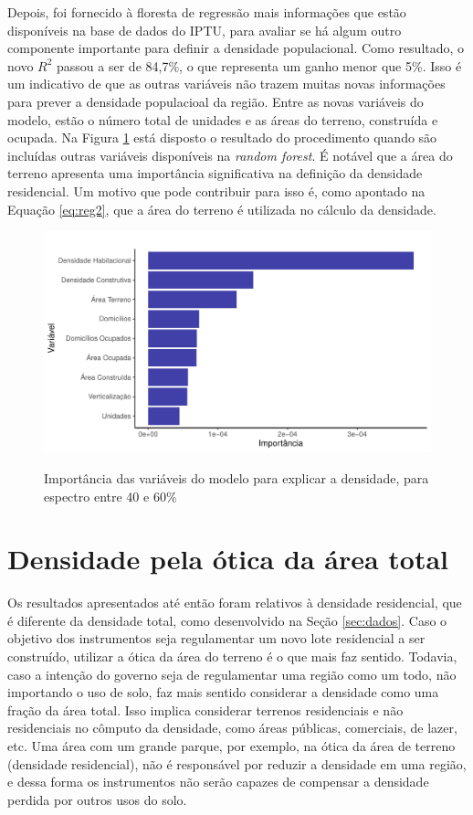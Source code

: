 Depois, foi fornecido à floresta de regressão mais informações que estão disponíveis na base de dados do IPTU, para avaliar se há algum outro componente importante para definir a densidade populacional. Como resultado, o novo $R^2$ passou a ser de 84,7\%, o que representa um ganho menor que 5\%. Isso é um indicativo de que as outras variáveis não trazem muitas novas informações para prever a densidade populacioal da região. Entre as novas variáveis do modelo, estão o número total de unidades e as áreas do terreno, construída e ocupada. Na Figura \ref{fig:importancia} está disposto o resultado do procedimento quando são incluídas outras variáveis disponíveis na \textit{random forest}. É notável que a área do terreno apresenta uma importância significativa na definição da densidade residencial. Um motivo que pode contribuir para isso é, como apontado na Equação \ref{eq:reg2}, que a área do terreno é utilizada no cálculo da densidade.

\begin{figure}[h]
    \centering
    \caption{Importância das variáveis do modelo para explicar a densidade, para espectro entre 40 e 60\%}
    \includegraphics[width = .95\linewidth]{imagens/var_importance.pdf}
    \label{fig:importancia}
\end{figure}

\section{Densidade pela ótica da área total}

Os resultados apresentados até então foram relativos à densidade residencial, que é diferente da densidade total, como desenvolvido na Seção \ref{sec:dados}. Caso o objetivo dos instrumentos seja regulamentar um novo lote residencial a ser construído, utilizar a ótica da área do terreno é o que mais faz sentido. Todavia, caso a intenção do governo seja de regulamentar uma região como um todo, não importando o uso de solo, faz mais sentido considerar a densidade como uma fração da área total. Isso implica considerar terrenos residenciais e não residenciais no cômputo da densidade, como áreas públicas, comerciais, de lazer, etc. Uma área com um grande parque, por exemplo, na ótica da área de terreno (densidade residencial), não é responsável por reduzir a densidade em uma região, e dessa forma os instrumentos não serão capazes de compensar a densidade perdida por outros usos do solo. 

